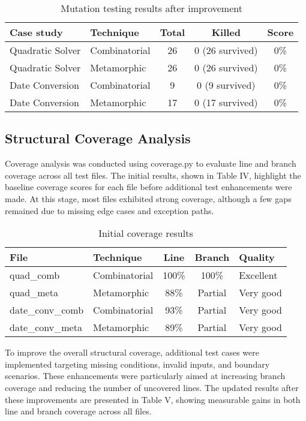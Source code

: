 \documentclass[conference]{IEEEtran}
\begin{document}
\begin{table}[htbp]
\caption{Mutation testing results after improvement}
\centering
\begin{tabular}{|l|l|c|c|c|}
\hline
Case study & Technique & Total & Killed & Score \\
\hline
Quadratic Solver & Combinatorial & 26 & 0 (26 survived) & 0\% \\
Quadratic Solver & Metamorphic   & 26 & 0 (26 survived) & 0\% \\
Date Conversion  & Combinatorial & 9  & 0 (9 survived)  & 0\% \\
Date Conversion  & Metamorphic   & 17 & 0 (17 survived) & 0\% \\
\hline
\end{tabular}
\end{table}
    

\subsection{Structural Coverage Analysis}
Coverage analysis was conducted using coverage.py to evaluate line and branch coverage across all test files. The initial results, shown in Table IV, highlight the baseline coverage scores for each file before additional test enhancements were made. At this stage, most files exhibited strong coverage, although a few gaps remained due to missing edge cases and exception paths.

\begin{table}[htbp]
\caption{Initial coverage results}
\centering
\begin{tabular}{|l|l|c|c|l|}
\hline
File & Technique & Line & Branch & Quality \\
\hline
quad\_comb & Combinatorial & 100\% & 100\% & Excellent \\
quad\_meta   & Metamorphic   & 88\%  & Partial & Very good \\
date\_conv\_comb & Combinatorial & 93\% & Partial & Very good \\
date\_conv\_meta   & Metamorphic   & 89\% & Partial & Very good \\
\hline
\end{tabular}
\end{table}
    
To improve the overall structural coverage, additional test cases were implemented targeting missing conditions, invalid inputs, and boundary scenarios. These enhancements were particularly aimed at increasing branch coverage and reducing the number of uncovered lines. The updated results after these improvements are presented in Table V, showing measurable gains in both line and branch coverage across all files.
\end{document}
